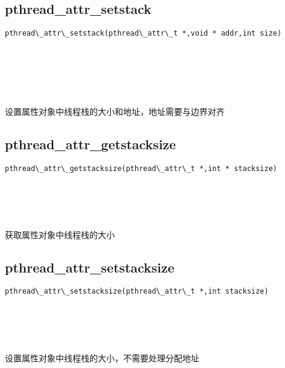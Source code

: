 \documentclass[10pt,a4paper]{article}
\begin{document}
\subsection{pthread\_attr\_setstack}
\begin{spacing}{2.0}
\lstset{language=C,numbers=none}
\begin{lstlisting}
pthread\_attr\_setstack(pthread\_attr\_t *,void * addr,int size)
\end{lstlisting}
{\large\color[rgb]{0.2,0.4,0.6}{*:}} \\
{\large\color[rgb]{0.2,0.4,0.6}{addr:}} \\
{\large\color[rgb]{0.2,0.4,0.6}{size:}}
\paragraph{ \ \ }设置属性对象中线程栈的大小和地址，地址需要与边界对齐
\end{spacing}

\subsection{pthread\_attr\_getstacksize}
\begin{spacing}{2.0}
\lstset{language=C,numbers=none}
\begin{lstlisting}
pthread\_attr\_getstacksize(pthread\_attr\_t *,int * stacksize)
\end{lstlisting}
{\large\color[rgb]{0.2,0.4,0.6}{*:}} \\
{\large\color[rgb]{0.2,0.4,0.6}{stacksize:}}
\paragraph{ \ \ }获取属性对象中线程栈的大小
\end{spacing}

\subsection{pthread\_attr\_setstacksize}
\begin{spacing}{2.0}
\lstset{language=C,numbers=none}
\begin{lstlisting}
pthread\_attr\_setstacksize(pthread\_attr\_t *,int stacksize)
\end{lstlisting}
{\large\color[rgb]{0.2,0.4,0.6}{*:}} \\
{\large\color[rgb]{0.2,0.4,0.6}{stacksize:}}
\paragraph{ \ \ }设置属性对象中线程栈的大小，不需要处理分配地址
\end{spacing}
\end{document}
